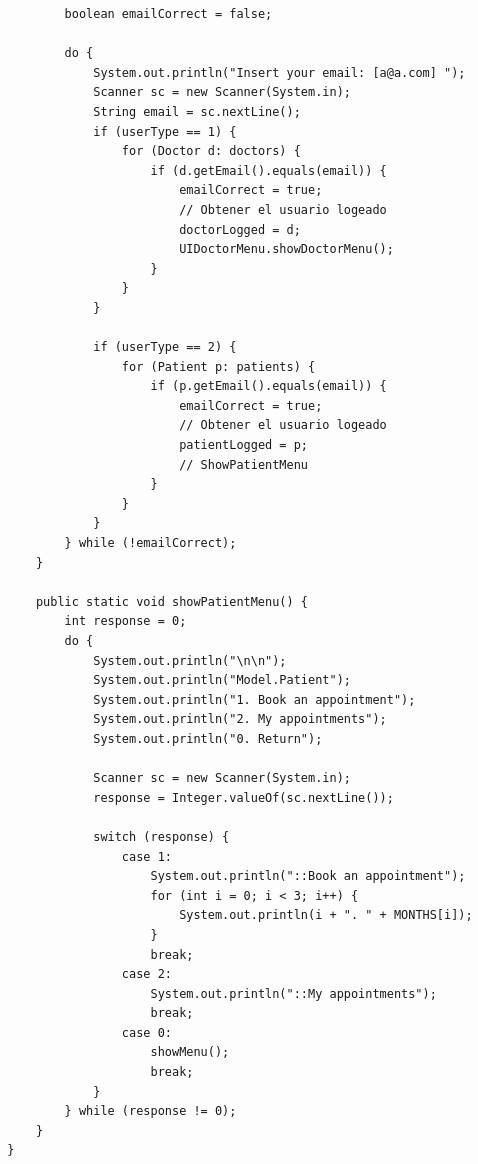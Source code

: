 \documentclass{article}
\begin{document}
\begin{verbatim}
          boolean emailCorrect = false;

          do {
              System.out.println("Insert your email: [a@a.com] ");
              Scanner sc = new Scanner(System.in);
              String email = sc.nextLine();
              if (userType == 1) {
                  for (Doctor d: doctors) {
                      if (d.getEmail().equals(email)) {
                          emailCorrect = true;
                          // Obtener el usuario logeado
                          doctorLogged = d;
                          UIDoctorMenu.showDoctorMenu();
                      }
                  }
              }

              if (userType == 2) {
                  for (Patient p: patients) {
                      if (p.getEmail().equals(email)) {
                          emailCorrect = true;
                          // Obtener el usuario logeado
                          patientLogged = p;
                          // ShowPatientMenu
                      }
                  }
              }
          } while (!emailCorrect);
      }

      public static void showPatientMenu() {
          int response = 0;
          do {
              System.out.println("\n\n");
              System.out.println("Model.Patient");
              System.out.println("1. Book an appointment");
              System.out.println("2. My appointments");
              System.out.println("0. Return");

              Scanner sc = new Scanner(System.in);
              response = Integer.valueOf(sc.nextLine());

              switch (response) {
                  case 1:
                      System.out.println("::Book an appointment");
                      for (int i = 0; i < 3; i++) {
                          System.out.println(i + ". " + MONTHS[i]);
                      }
                      break;
                  case 2:
                      System.out.println("::My appointments");
                      break;
                  case 0:
                      showMenu();
                      break;
              }
          } while (response != 0);
      }
  }
\end{verbatim}
\end{document}
